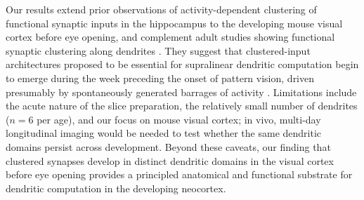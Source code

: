 \documentclass[11pt]{article}
\begin{document}
Our results extend prior observations of activity-dependent clustering of functional synaptic inputs in the hippocampus \cite{kleindienst2011clustered,winnubst2015} to the developing mouse visual cortex before eye opening, and complement adult studies showing functional synaptic clustering along dendrites \cite{iacaruso2017synaptic,scholl2017local,wilson2016division,kerlin2019functional,fu2012repetitive}. They suggest that clustered-input architectures proposed to be essential for supralinear dendritic computation \cite{poirazi2003pyramidal,larkum2004active,golding2002dendritic,govindarajan2011memory} begin to emerge during the week preceding the onset of pattern vision, driven presumably by spontaneously generated barrages of activity \cite{katz1996synaptic,siegel2012peripheral,allene2008sequential,khazipov2004early}. Limitations include the acute nature of the slice preparation, the relatively small number of dendrites ($n = 6$ per age), and our focus on mouse visual cortex; in vivo, multi-day longitudinal imaging would be needed to test whether the same dendritic domains persist across development. Beyond these caveats, our finding that clustered synapses develop in distinct dendritic domains in the visual cortex before eye opening provides a principled anatomical and functional substrate for dendritic computation in the developing neocortex.



\end{document}
